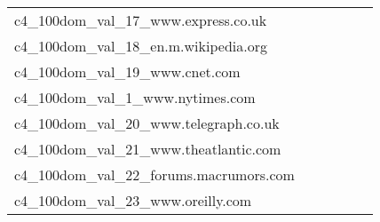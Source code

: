 {\begin{longtable}{m{6cm}m{1.7cm}m{1.7cm}m{1.7cm}m{1.7cm}m{1.7cm}}
	c4\_100dom\_val\_17\_www.express.co.uk  & \colorbox[HTML]{ffffe5}{\makebox[\mywidth][c]{11.57}} & \colorbox[HTML]{f5fbb8}{\makebox[\mywidth][c]{11.04}} & \colorbox[HTML]{ffffe5}{\makebox[\mywidth][c]{11.84}} & \colorbox[HTML]{eaf7af}{\makebox[\mywidth][c]{10.99}} & \colorbox[HTML]{77c578}{\makebox[\mywidth][c]{10.79}}\\
	c4\_100dom\_val\_18\_en.m.wikipedia.org  & \colorbox[HTML]{ffffe5}{\makebox[\mywidth][c]{9.28}} & \colorbox[HTML]{f1f9b4}{\makebox[\mywidth][c]{8.95}} & \colorbox[HTML]{ffffe5}{\makebox[\mywidth][c]{9.52}} & \colorbox[HTML]{d8efa2}{\makebox[\mywidth][c]{8.89}} & \colorbox[HTML]{77c578}{\makebox[\mywidth][c]{8.80}}\\
	c4\_100dom\_val\_19\_www.cnet.com  & \colorbox[HTML]{fefee2}{\makebox[\mywidth][c]{12.61}} & \colorbox[HTML]{f3fab6}{\makebox[\mywidth][c]{12.23}} & \colorbox[HTML]{ffffe5}{\makebox[\mywidth][c]{13.12}} & \colorbox[HTML]{c9e99b}{\makebox[\mywidth][c]{12.09}} & \colorbox[HTML]{77c578}{\makebox[\mywidth][c]{11.97}}\\
	c4\_100dom\_val\_1\_www.nytimes.com  & \colorbox[HTML]{fdfedb}{\makebox[\mywidth][c]{13.13}} & \colorbox[HTML]{dcf1a5}{\makebox[\mywidth][c]{12.66}} & \colorbox[HTML]{ffffe5}{\makebox[\mywidth][c]{14.04}} & \colorbox[HTML]{e0f2a8}{\makebox[\mywidth][c]{12.68}} & \colorbox[HTML]{77c578}{\makebox[\mywidth][c]{12.44}}\\
	c4\_100dom\_val\_20\_www.telegraph.co.uk  & \colorbox[HTML]{fefee3}{\makebox[\mywidth][c]{13.71}} & \colorbox[HTML]{e3f4aa}{\makebox[\mywidth][c]{13.10}} & \colorbox[HTML]{ffffe5}{\makebox[\mywidth][c]{14.28}} & \colorbox[HTML]{daf0a4}{\makebox[\mywidth][c]{13.06}} & \colorbox[HTML]{77c578}{\makebox[\mywidth][c]{12.88}}\\
	c4\_100dom\_val\_21\_www.theatlantic.com  & \colorbox[HTML]{fdfede}{\makebox[\mywidth][c]{14.70}} & \colorbox[HTML]{daf0a4}{\makebox[\mywidth][c]{14.17}} & \colorbox[HTML]{ffffe5}{\makebox[\mywidth][c]{15.54}} & \colorbox[HTML]{d8efa2}{\makebox[\mywidth][c]{14.17}} & \colorbox[HTML]{77c578}{\makebox[\mywidth][c]{13.97}}\\
	c4\_100dom\_val\_22\_forums.macrumors.com  & \colorbox[HTML]{fbfdd4}{\makebox[\mywidth][c]{17.77}} & \colorbox[HTML]{e7f5ad}{\makebox[\mywidth][c]{17.34}} & \colorbox[HTML]{ffffe5}{\makebox[\mywidth][c]{19.15}} & \colorbox[HTML]{d5eea1}{\makebox[\mywidth][c]{17.22}} & \colorbox[HTML]{77c578}{\makebox[\mywidth][c]{16.95}}\\
	c4\_100dom\_val\_23\_www.oreilly.com  & \colorbox[HTML]{fafdce}{\makebox[\mywidth][c]{13.36}} & \colorbox[HTML]{bae294}{\makebox[\mywidth][c]{12.99}} & \colorbox[HTML]{ffffe5}{\makebox[\mywidth][c]{14.31}} & \colorbox[HTML]{c6e89a}{\makebox[\mywidth][c]{13.02}} & \colorbox[HTML]{77c578}{\makebox[\mywidth][c]{12.88}}\\

\end{longtable}}
